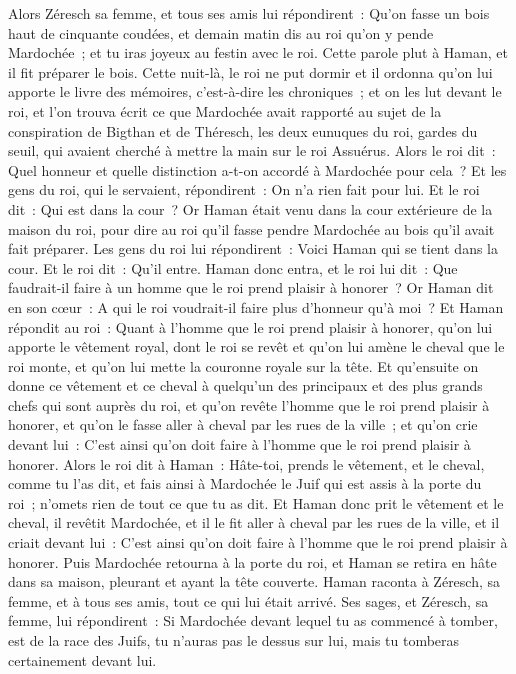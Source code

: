 \begin{multicols}{2}
Alors Zéresch sa femme, et tous ses amis lui répondirent~: Qu'on fasse un bois haut de cinquante coudées, et demain matin dis au roi qu'on y pende Mardochée~; et tu iras joyeux au festin avec le roi. Cette parole plut à Haman, et il fit préparer le bois.
\VerseOne{}Cette nuit-là, le roi ne put dormir et il ordonna qu'on lui apporte le livre des mémoires, c'est-à-dire les chroniques~; et on les lut devant le roi,
et l'on trouva écrit ce que Mardochée avait rapporté au sujet de la conspiration de Bigthan et de Théresch, les deux eunuques du roi, gardes du seuil, qui avaient cherché à mettre la main sur le roi Assuérus.
Alors le roi dit~: Quel honneur et quelle distinction a-t-on accordé à Mardochée pour cela~? Et les gens du roi, qui le servaient, répondirent~: On n'a rien fait pour lui.
Et le roi dit~: Qui est dans la cour~? Or Haman était venu dans la cour extérieure de la maison du roi, pour dire au roi qu'il fasse pendre Mardochée au bois qu'il avait fait préparer.
Les gens du roi lui répondirent~: Voici Haman qui se tient dans la cour. Et le roi dit~: Qu'il entre.
Haman donc entra, et le roi lui dit~: Que faudrait-il faire à un homme que le roi prend plaisir à honorer~? Or Haman dit en son cœur~: A qui le roi voudrait-il faire plus d'honneur qu'à moi~?
Et Haman répondit au roi~: Quant à l'homme que le roi prend plaisir à honorer,
qu'on lui apporte le vêtement royal, dont le roi se revêt et qu'on lui amène le cheval que le roi monte, et qu'on lui mette la couronne royale sur la tête.
Et qu'ensuite on donne ce vêtement et ce cheval à quelqu'un des principaux et des plus grands chefs qui sont auprès du roi, et qu'on revête l'homme que le roi prend plaisir à honorer, et qu'on le fasse aller à cheval par les rues de la ville~; et qu'on crie devant lui~: C'est ainsi qu'on doit faire à l'homme que le roi prend plaisir à honorer.
Alors le roi dit à Haman~: Hâte-toi, prends le vêtement, et le cheval, comme tu l'as dit, et fais ainsi à Mardochée le Juif qui est assis à la porte du roi~; n'omets rien de tout ce que tu as dit.
Et Haman donc prit le vêtement et le cheval, il revêtit Mardochée, et il le fit aller à cheval par les rues de la ville, et il criait devant lui~: C'est ainsi qu'on doit faire à l'homme que le roi prend plaisir à honorer.
Puis Mardochée retourna à la porte du roi, et Haman se retira en hâte dans sa maison, pleurant et ayant la tête couverte.
Haman raconta à Zéresch, sa femme, et à tous ses amis, tout ce qui lui était arrivé. Ses sages, et Zéresch, sa femme, lui répondirent~: Si Mardochée devant lequel tu as commencé à tomber, est de la race des Juifs, tu n'auras pas le dessus sur lui, mais tu tomberas certainement devant lui.

\end{multicols}
